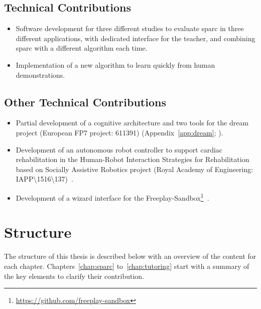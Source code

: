 \subsection{Technical Contributions}

\begin{itemize}
	\item Software development for three different studies to evaluate \gls{sparc} in three different applications, with dedicated interface for the teacher, and combining \gls{sparc} with a different algorithm each time.
	\item Implementation of a new algorithm to learn quickly from human demonstrations.
\end{itemize}

\subsection{Other Technical Contributions}

\begin{itemize}
	\item Partial development of a cognitive architecture and two tools for the \acrshort{dream} project (European FP7 project: 611391) (Appendix~\ref{app:dream}; \citealt{esteban2017build}).
	\item Development of an autonomous robot controller to support cardiac rehabilitation in the Human-Robot Interaction Strategies for Rehabilitation based on Socially Assistive Robotics project (Royal Academy of Engineering: IAPP\textbackslash1516\textbackslash137)~\citep{lara2017human,casas2018social}.
	\item Development of a wizard interface for the Freeplay-Sandbox\footnote{\url{https://github.com/freeplay-sandbox}}~\citep{lemaignan2017free,wallbridge2018spatial}.
\end{itemize}
	
\section{Structure}\label{sec:intro_struct}

The structure of this thesis is described below with an overview of the content for each chapter. Chapters~\ref{chap:sparc} to~\ref{chap:tutoring} start with a summary of the key elements to clarify their contribution.


